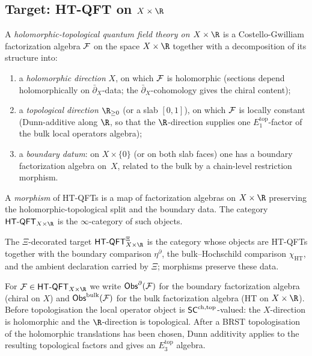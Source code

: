 \subsection{Target: HT-QFT on $X \times \R$}

\begin{definition}
\label{def:uhf-ht-qft-factorization}
A \emph{holomorphic-topological quantum field theory on
$X \times \R$} is a Costello-Gwilliam factorization algebra
$\mathcal{F}$ on the space $X \times \R$ together with a decomposition of
its structure into:
\begin{enumerate}[label=\textup{(\roman*)}]
\item a \emph{holomorphic direction} $X$, on which $\mathcal{F}$ is
 holomorphic (sections depend holomorphically on
 $\bar\partial_X$-data; the $\bar\partial_X$-cohomology gives the
 chiral content);
\item a \emph{topological direction} $\R_{\ge0}$ \textup{(}or a slab
 $[0,1]$\textup{)}, on which $\mathcal{F}$ is
 locally constant (Dunn-additive along $\R$, so that the
 $\R$-direction supplies one $E_1^{\mathrm{top}}$-factor of the
 bulk local operators algebra);
\item a \emph{boundary datum}: on $X\times\{0\}$ \textup{(}or on both
 slab faces\textup{)} one has a boundary factorization algebra on~$X$,
 related to the bulk by a chain-level restriction morphism.
\end{enumerate}
A \emph{morphism} of HT-QFTs is a map of factorization algebras on
$X \times \R$ preserving the holomorphic-topological split and the
boundary data. The category $\HTQFT_{X \times \R}$ is the
$\infty$-category of such objects.

The $\Xi$-decorated target
\(\HTQFT^\Xi_{X \times \R}\) is the category whose objects are
HT-QFTs together with the boundary comparison
\(\eta^\partial\), the bulk--Hochschild comparison
\(\chi_{\mathrm{HT}}\), and the ambient declaration carried by
\(\Xi\); morphisms preserve these data.

For $\cF \in \HTQFT_{X \times \R}$ we write $\mathsf{Obs}^\partial(\mathcal{F})$ for
the boundary factorization algebra (chiral on $X$) and
$\mathsf{Obs}^{\mathrm{bulk}}(\mathcal{F})$ for the bulk factorization algebra
(HT on $X \times \R$). Before topologisation the local operator
object is $\mathsf{SC}^{\mathrm{ch},\mathrm{top}}$-valued: the $X$-direction is holomorphic and
the $\R$-direction is topological. After a BRST topologisation of
the holomorphic translations has been chosen, Dunn additivity applies
to the resulting topological factors and gives an
$E_3^{\mathrm{top}}$ algebra.
\end{definition}

